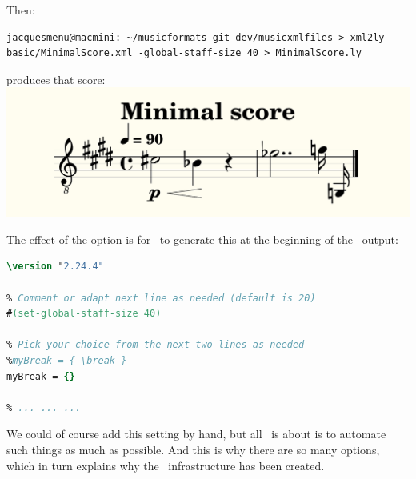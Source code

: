 Then:
\begin{lstlisting}[language=Terminal]
jacquesmenu@macmini: ~/musicformats-git-dev/musicxmlfiles > xml2ly basic/MinimalScore.xml -global-staff-size 40 > MinimalScore.ly
\end{lstlisting}

produces that score:\\
\includegraphics[scale=0.7]{../mfgraphics/mfgraphicsMinimalScoreEnlarged.png}

The effect of the  option is for \xmlToLy\ to generate this at the beginning of the \lily\ output:
\begin{lstlisting}[language=Lilypond]
\version "2.24.4"

% Comment or adapt next line as needed (default is 20)
#(set-global-staff-size 40)

% Pick your choice from the next two lines as needed
%myBreak = { \break }
myBreak = {}

% ... ... ...
\end{lstlisting}

We could of course add this  setting by hand, but all \mf\ is about is to automate such things as much as possible. And this is why there are so many options, which in turn explains why the \oahRepr\ infrastructure has been created.


